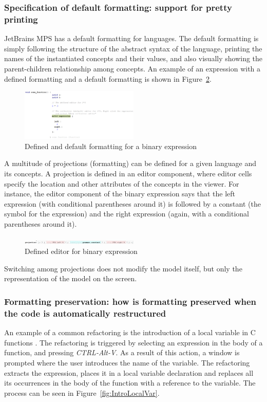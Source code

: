 \documentclass[preprint,numbers,10pt]{sigplanconf}
\begin{document}
\subsubsection{Specification of default formatting: support for pretty printing}
JetBrains MPS has a default formatting for languages. The default formatting is simply following
the structure of the abstract syntax of the language, printing the names of the instantiated concepts and
their values, and also visually showing the parent-children relationship among concepts.
An example of an expression with a defined formatting and
a default formatting is shown in Figure~\ref{fig:DefaultEditor}.

\begin{figure}[H]
	\centering
	\includegraphics[width=0.50\textwidth]{screens/DefaultEditor.png}
	\caption{Defined and default formatting for a binary expression}
	\label{fig:DefaultEditor}
\end{figure}

A multitude of projections (formatting) can be defined for a given language and its concepts.
A projection is defined in an editor component, where editor cells specify the location and other attributes
of the concepts in the viewer. For instance, the editor component of the binary expression
says that the left expression (with conditional parentheses around it) is followed by a constant (the
symbol for the expression) and the right expression (again, with a conditional parentheses around it).

\begin{figure}[H]
	\centering
	\includegraphics[width=0.50\textwidth]{screens/EditorMultiExpression.png}
	\caption{Defined editor for binary expression}
	\label{fig:DefaultEditor}
\end{figure}

Switching among projections does not modify the model itself, but only the representation of the model
on the screen.

\subsubsection{Formatting preservation: how is formatting preserved when the code is automatically restructured}
An example of a common refactoring is the introduction of a local variable in C functions \cite{voelter2014generic}.
The refactoring is triggered by selecting an expression in the body of a function, and pressing \emph{CTRL-Alt-V}.
As a result of this action, a window is prompted where the user introduces the name of the variable.
The refactoring extracts the expression, places it in a
local variable declaration and replaces all its occurrences in the body of the function with a reference to the variable.
The process can be seen in Figure~\ref{fig:IntroLocalVar}.
\end{document}

